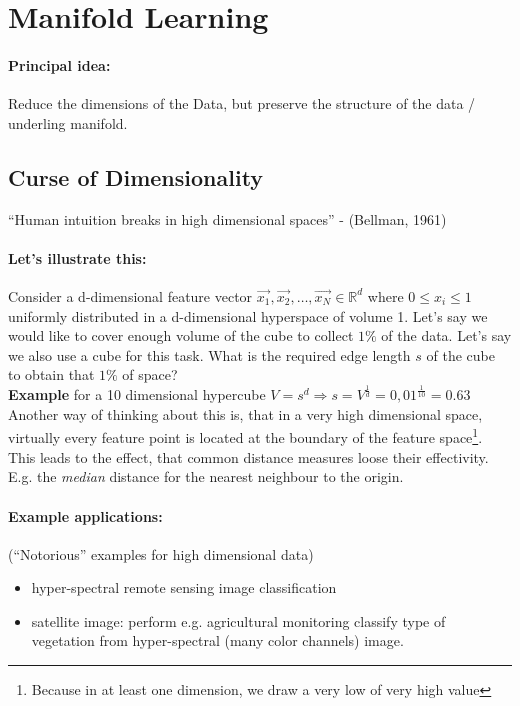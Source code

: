 
\section*{Manifold Learning}
\paragraph{Principal idea:} Reduce the dimensions of the Data, but preserve the structure of the data / underling manifold.

\subsection*{Curse of Dimensionality}
``Human intuition breaks in high dimensional spaces'' - (Bellman, 1961)

\paragraph{Let's illustrate this:}
Consider a d-dimensional feature vector $\vec{x_1}, \vec{x_2}, \dots, \vec{x_N} \in \mathbb{R}^d$ where $0 \le x_i \le 1$ uniformly distributed in a d-dimensional hyperspace of volume 1.
Let's say we would like to cover enough volume of  the cube to collect $1\%$ of the data. Let's say we also use a cube for this task. What is the required edge length $s$ of the cube to obtain that $1\%$ of space?\\

\textbf{Example} for a 10 dimensional hypercube $V=s^d \Rightarrow s = V^{\frac{1}{d}} = 0,01^{\frac{1}{10}} = 0.63$\\

Another way of thinking about this is, that in a very high dimensional space, virtually every feature point is located at the boundary of the feature space\footnote{Because in at least one dimension, we draw a very low of very high value}. This leads to the effect, that common distance measures loose their  effectivity. E.g. the \textit{median} distance for the nearest neighbour to the origin.

\paragraph{Example applications:}
(``Notorious'' examples for high dimensional data)

\begin{itemize}
    \item hyper-spectral remote sensing image classification
    \item satellite image:  perform e.g. agricultural monitoring classify type of vegetation from hyper-spectral (many color channels) image.
\end{itemize}

